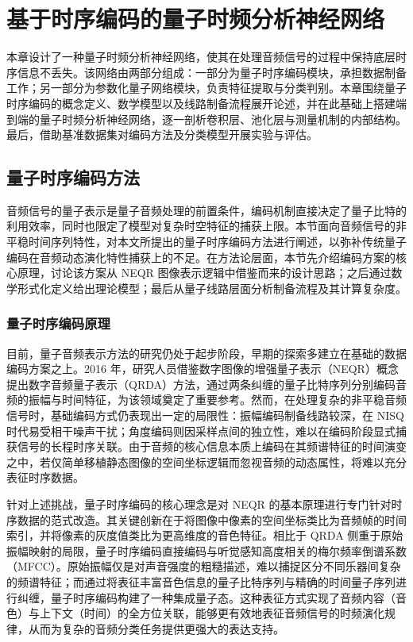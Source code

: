 
\section{基于时序编码的量子时频分析神经网络}
\label{chap:qann_qtse}
本章设计了一种量子时频分析神经网络，使其在处理音频信号的过程中保持底层时序信息不丢失。该网络由两部分组成：一部分为量子时序编码模块，承担数据制备工作；另一部分为参数化量子网络模块，负责特征提取与分类判别。本章围绕量子时序编码的概念定义、数学模型以及线路制备流程展开论述，并在此基础上搭建端到端的量子时频分析神经网络，逐一剖析卷积层、池化层与测量机制的内部结构。最后，借助基准数据集对编码方法及分类模型开展实验与评估。

\subsection{量子时序编码方法}
\label{sec:qtse_method}
音频信号的量子表示是量子音频处理的前置条件，编码机制直接决定了量子比特的利用效率，同时也限定了模型对复杂时空特征的捕获上限。本节面向音频信号的非平稳时间序列特性，对本文所提出的量子时序编码方法进行阐述，以弥补传统量子编码在音频动态演化特性捕获上的不足。在方法论层面，本节先介绍编码方案的核心原理，讨论该方案从 NEQR 图像表示逻辑中借鉴而来的设计思路；之后通过数学形式化定义给出理论模型；最后从量子线路层面分析制备流程及其计算复杂度。

\subsubsection{量子时序编码原理}
\label{sec:qtse_scheme}
目前，量子音频表示方法的研究仍处于起步阶段，早期的探索多建立在基础的数据编码方案之上。2016 年，研究人员借鉴数字图像的增强量子表示（NEQR）概念提出数字音频量子表示（QRDA）方法，通过两条纠缠的量子比特序列分别编码音频的振幅与时间特征，为该领域奠定了重要参考。然而，在处理复杂的非平稳音频信号时，基础编码方式仍表现出一定的局限性：振幅编码制备线路较深，在 NISQ 时代易受相干噪声干扰；角度编码则因采样点间的独立性，难以在编码阶段显式捕获信号的长程时序关联。由于音频的核心信息本质上编码在其频谱特征的时间演变之中，若仅简单移植静态图像的空间坐标逻辑而忽视音频的动态属性，将难以充分表征时序数据。

针对上述挑战，量子时序编码的核心理念是对 NEQR 的基本原理进行专门针对时序数据的范式改造。其关键创新在于将图像中像素的空间坐标类比为音频帧的时间索引，并将像素的灰度值类比为更高维度的音色特征。相比于 QRDA 侧重于原始振幅映射的局限，量子时序编码直接编码与听觉感知高度相关的梅尔频率倒谱系数（MFCC）。原始振幅仅是对声音强度的粗糙描述，难以捕捉区分不同乐器间复杂的频谱特征；而通过将表征丰富音色信息的量子比特序列与精确的时间量子序列进行纠缠，量子时序编码构建了一种集成量子态。这种表征方式实现了音频内容（音色）与上下文（时间）的全方位关联，能够更有效地表征音频信号的时频演化规律，从而为复杂的音频分类任务提供更强大的表达支持。

